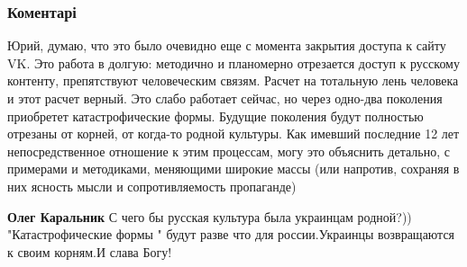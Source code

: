  
 
 
 
 
\subsubsection{Коментарі}

\begin{itemize}
 

Юрий, думаю, что это было очевидно еще с момента закрытия доступа к сайту VK.
Это работа в долгую: методично и планомерно отрезается доступ к русскому
контенту, препятствуют человеческим связям. Расчет на тотальную лень человека и
этот расчет верный. Это слабо работает сейчас, но через одно-два поколения
приобретет катастрофические формы. Будущие поколения будут полностью отрезаны
от корней, от когда-то родной культуры. Как имевший последние 12 лет
непосредственное отношение к этим процессам, могу это объяснить детально, с
примерами и методиками, меняющими широкие массы (или напротив, сохраняя в них
ясность мысли и сопротивляемость пропаганде)

\begin{itemize}
 
\textbf{Олег Каральник} С чего бы русская культура была украинцам родной?)) "Катастрофические формы " будут разве что для россии.Украинцы возвращаются к своим корням.И слава Богу!
\end{itemize}

 


\end{itemize}
